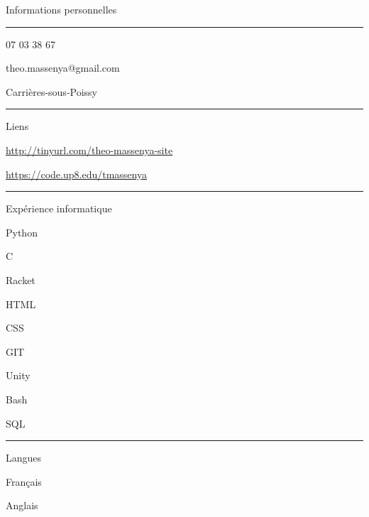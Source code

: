 \documentclass{letter}
\begin{document}
\begin{minipage}[t]{0.40\textwidth}
\setlength{\baselineskip}{1.5\baselineskip}
\color{white}
\vspace{1cm}
{\large Informations personnelles}

\rule{\linewidth}{0.4pt}

\faPhone {} 07 03 38 67

\faEnvelope \quad theo.massenya@gmail.com

\faMapMarker \quad Carrières-sous-Poissy

\rule{\linewidth}{0.4pt}

{\large Liens}

\faCode \quad \href{google.com}{\href{http://tinyurl.com/theo-massenya-site}{http://tinyurl.com/theo-massenya-site}}

\faGitlab \quad \href{https://code.up8.edu/tmassenya}{https://code.up8.edu/tmassenya}

\rule{\linewidth}{0.4pt}

{\large Expérience informatique }

\faCircleNotch \quad Python   

\faCircleNotch \quad C

\faCircleNotch \quad Racket

\faCircleNotch \quad HTML

\faCircleNotch \quad CSS

\faCircleNotch \quad GIT

\faCircleNotch \quad Unity

\faCircleNotch \quad Bash

\faCircleNotch \quad SQL 

\rule{\linewidth}{0.4pt}

{\large Langues}

\faLanguage \quad Français

\faLanguage \quad Anglais

\end{minipage}
\hfill
\end{document}
